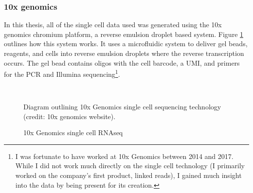\subsubsection{10x genomics}

\par{
In this thesis, all of the single cell data used was generated using the 10x genomics chromium platform, a reverse emulsion droplet based system. Figure \ref{figure:10xsinglecell} outlines how this system works. It uses a microfluidic system to deliver gel beads, reagents, and cells into reverse emulsion droplets where the reverse transcription occurs. The gel bead contains oligos with the cell barcode, a UMI, and primers for the PCR and Illumina sequencing\cite{10xsinglecell}\footnote{I was fortunate to have worked at 10x Genomics between 2014 and 2017. While I did not work much directly on the single cell technology (I primarily worked on the company's first product, linked reads), I gained much insight into the data by being present for its creation.}.
}
\begin{figure}[htbp!]
\caption{10x Genomics single cell RNAseq}
\label{figure:10xsinglecell}
\begin{centering}
 \\
\par{Diagram outlining 10x Genomics single cell sequencing technology (credit: 10x genomics website).}
\end{centering}
\end{figure}

